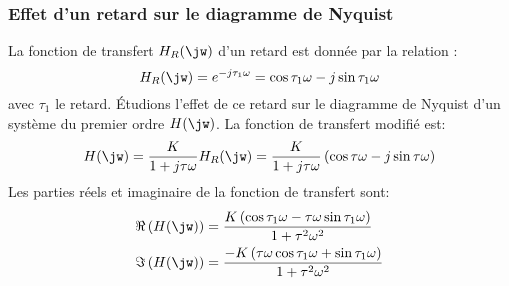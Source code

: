 \subsubsection{Effet d'un retard sur le diagramme de Nyquist}

La fonction de transfert $H_R(\jw)$ d'un retard est donnée par la relation :
$$
H_R(\jw)=e^{-j\tau_1\omega}=\cos{\tau_1\omega}-j\sin{\tau_1\omega}
$$
avec $\tau_1$ le retard. 
\'Etudions l'effet de ce retard sur le diagramme de Nyquist d'un système du premier ordre $H(\jw)$.
La fonction de transfert modifié est:
$$
H(\jw)=\dfrac{K}{1+j\tau\omega}H_R(\jw)=\dfrac{K}{1+j\tau\omega}\left(\cos{\tau\omega}-j\sin{\tau\omega}\right)
$$
Les parties réels et imaginaire de la fonction de transfert sont:
\begin{align*}
    \Re\left(H(\jw)\right)&=\dfrac{K\left(\cos{\tau_1\omega-\tau\omega\sin{\tau_1\omega}}\right)}{1+\tau^2\omega^2}\\
    \Im\left(H(\jw)\right)&=\dfrac{-K\left(\tau\omega\cos{\tau_1\omega+\sin{\tau_1\omega}}\right)}{1+\tau^2\omega^2}\\
\end{align*}

